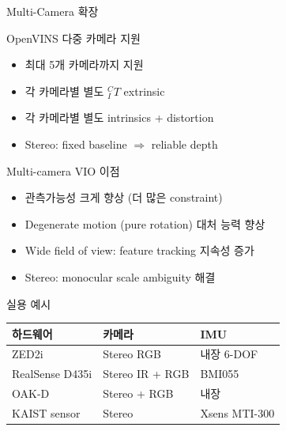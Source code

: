 \begin{frame}[shrink=10]{Multi-Camera 확장}
  \begin{block}{OpenVINS 다중 카메라 지원}
    \begin{itemize}
      \item 최대 5개 카메라까지 지원
      \item 각 카메라별 별도 ${}^C_I T$ extrinsic
      \item 각 카메라별 별도 intrinsics + distortion
      \item Stereo: fixed baseline $\Rightarrow$ reliable depth
    \end{itemize}
  \end{block}
  \begin{block}{Multi-camera VIO 이점}
    \begin{itemize}
      \item 관측가능성 크게 향상 (더 많은 constraint)
      \item Degenerate motion (pure rotation) 대처 능력 향상
      \item Wide field of view: feature tracking 지속성 증가
      \item Stereo: monocular scale ambiguity 해결
    \end{itemize}
  \end{block}
  \begin{exampleblock}{실용 예시}
    \begin{tabular}{lll}
      \textbf{하드웨어} & \textbf{카메라} & \textbf{IMU} \\\hline
      ZED2i & Stereo RGB & 내장 6-DOF \\
      RealSense D435i & Stereo IR + RGB & BMI055 \\
      OAK-D & Stereo + RGB & 내장 \\
      KAIST sensor & Stereo & Xsens MTI-300 \\
    \end{tabular}
  \end{exampleblock}
\end{frame}


